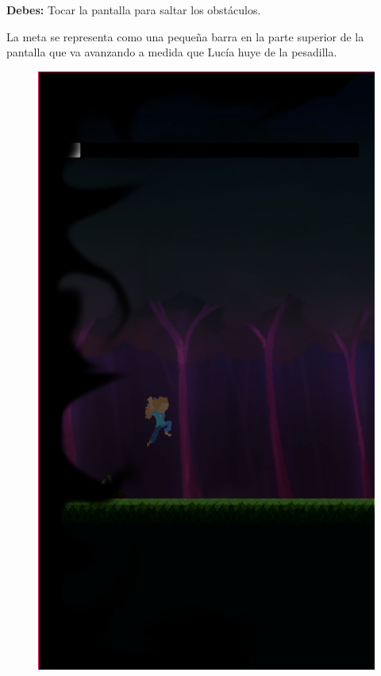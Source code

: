 \textbf{Debes:} Tocar la pantalla para saltar los obstáculos.

La meta se representa como una pequeña barra en la parte superior de la pantalla que va avanzando a medida que Lucía huye de la pesadilla.


\begin{figure}[h]
	\centering
	\begin{minipage}{0.45\textwidth}
   		\includegraphics[scale=.5]{imgs/screenshot05.png}
	\end{minipage}
	\begin{minipage}{0.45\textwidth}
		\begin{flushright}

\end{flushright}
\end{minipage}
\end{figure}
